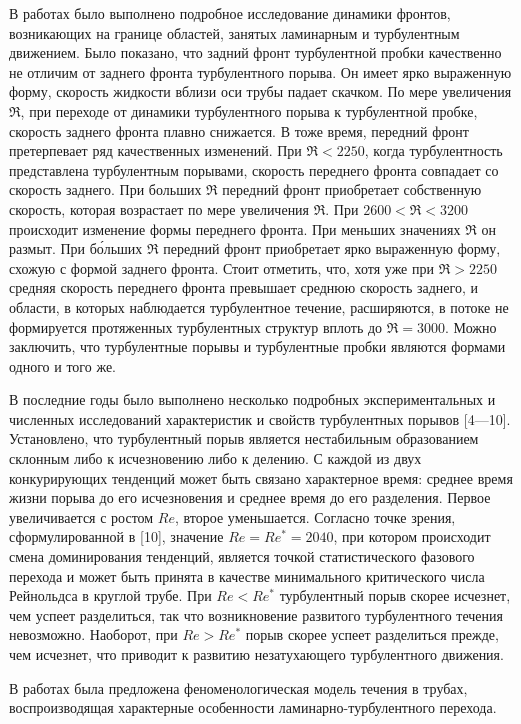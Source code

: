 В работах \cite{Moxey2010, Barkley2015, Song2017} было выполнено подробное исследование динамики фронтов, возникающих на границе областей, занятых ламинарным и турбулентным движением. Было показано, что задний фронт турбулентной пробки качественно не отличим от заднего фронта турбулентного порыва. Он имеет ярко выраженную форму, скорость жидкости вблизи оси трубы падает скачком. По мере увеличения $\Re$, при переходе от динамики турбулентного порыва к турбулентной пробке, скорость заднего фронта плавно снижается. В тоже время, передний фронт претерпевает ряд качественных изменений. При $\Re < 2250$, когда турбулентность представлена турбулентным порывами, скорость переднего фронта совпадает со скорость заднего. При больших $\Re$ передний фронт приобретает собственную скорость, которая возрастает по мере увеличения $\Re$. При $2600 < \Re < 3200$ происходит изменение формы переднего фронта. При меньших значениях $\Re$ он размыт. При б\'{о}льших $\Re$ передний фронт приобретает ярко выраженную форму, схожую с формой заднего фронта. Стоит отметить, что, хотя уже при $\Re > 2250$ средняя скорость переднего фронта превышает среднюю скорость заднего, и области, в которых наблюдается турбулентное течение, расширяются, в потоке не формируется протяженных турбулентных структур вплоть до $\Re = 3000$. Можно заключить, что турбулентные порывы и турбулентные пробки являются формами одного и того же. 

В последние годы было выполнено несколько подробных экспериментальных и численных исследований характеристик и свойств турбулентных порывов [4---10]. Установлено, что турбулентный порыв является нестабильным образованием склонным либо к исчезновению либо к делению. С каждой из двух конкурирующих тенденций может быть связано характерное время: среднее время жизни порыва до его исчезновения и среднее время до его разделения. Первое увеличивается с ростом $Re$, второе уменьшается. Согласно точке зрения, сформулированной в [10], значение $Re=Re^*=2040$, при котором происходит смена доминирования тенденций, является точкой статистического фазового перехода и может быть принята в качестве минимального критического числа Рейнольдса в круглой трубе. При $Re<Re^*$ турбулентный порыв скорее исчезнет, чем успеет разделиться, так что возникновение развитого турбулентного течения невозможно. Наоборот, при $Re>Re^*$ порыв скорее успеет разделиться прежде, чем исчезнет, что приводит к развитию незатухающего турбулентного движения.


В работах \cite{Barkley2015, Barkley2016} была предложена феноменологическая модель течения в трубах, воспроизводящая характерные особенности ламинарно-турбулентного перехода. 

